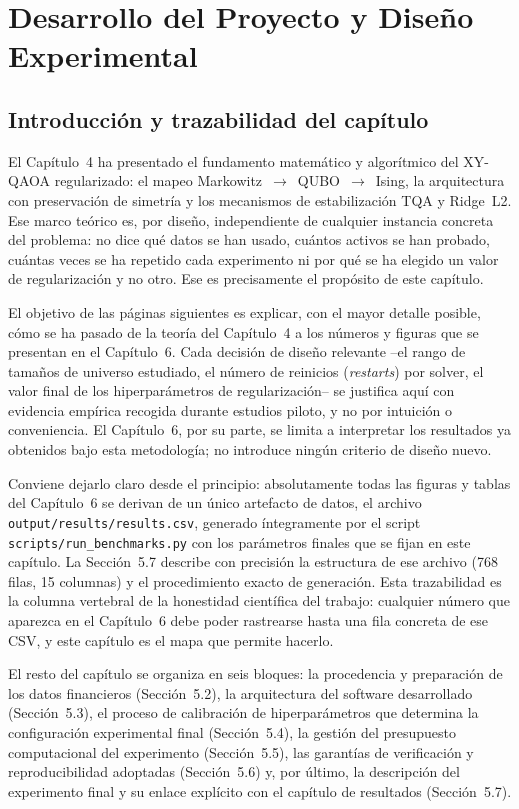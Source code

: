 \chapter{Desarrollo del Proyecto y Diseño Experimental}
\label{ch:desarrollo}

\section{Introducción y trazabilidad del capítulo}

El Capítulo~4 ha presentado el fundamento matemático y algorítmico del XY-QAOA regularizado: el mapeo Markowitz~$\rightarrow$~QUBO~$\rightarrow$~Ising, la arquitectura con preservación de simetría y los mecanismos de estabilización TQA y Ridge~L2. Ese marco teórico es, por diseño, independiente de cualquier instancia concreta del problema: no dice qué datos se han usado, cuántos activos se han probado, cuántas veces se ha repetido cada experimento ni por qué se ha elegido un valor de regularización y no otro. Ese es precisamente el propósito de este capítulo.

El objetivo de las páginas siguientes es explicar, con el mayor detalle posible, cómo se ha pasado de la teoría del Capítulo~4 a los números y figuras que se presentan en el Capítulo~6. Cada decisión de diseño relevante --el rango de tamaños de universo estudiado, el número de reinicios (\textit{restarts}) por solver, el valor final de los hiperparámetros de regularización-- se justifica aquí con evidencia empírica recogida durante estudios piloto, y no por intuición o conveniencia. El Capítulo~6, por su parte, se limita a interpretar los resultados ya obtenidos bajo esta metodología; no introduce ningún criterio de diseño nuevo.

Conviene dejarlo claro desde el principio: absolutamente todas las figuras y tablas del Capítulo~6 se derivan de un único artefacto de datos, el archivo \texttt{output/results/results.csv}, generado íntegramente por el script \texttt{scripts/run\_benchmarks.py} con los parámetros finales que se fijan en este capítulo. La Sección~5.7 describe con precisión la estructura de ese archivo (768 filas, 15 columnas) y el procedimiento exacto de generación. Esta trazabilidad es la columna vertebral de la honestidad científica del trabajo: cualquier número que aparezca en el Capítulo~6 debe poder rastrearse hasta una fila concreta de ese CSV, y este capítulo es el mapa que permite hacerlo.

El resto del capítulo se organiza en seis bloques: la procedencia y preparación de los datos financieros (Sección~5.2), la arquitectura del software desarrollado (Sección~5.3), el proceso de calibración de hiperparámetros que determina la configuración experimental final (Sección~5.4), la gestión del presupuesto computacional del experimento (Sección~5.5), las garantías de verificación y reproducibilidad adoptadas (Sección~5.6) y, por último, la descripción del experimento final y su enlace explícito con el capítulo de resultados (Sección~5.7).

